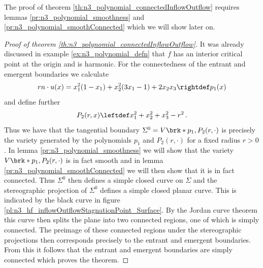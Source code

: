 The proof of theorem \ref{th:n3_polynomial_connectedInflowOutflow} requires lemmas \ref{pr:n3_polynomial_smoothness} and \ref{pr:n3_polynomial_smoothConnected}
which we will show later on.
\begin{proof}[Proof of theorem {\ref{th:n3_polynomial_connectedInflowOutflow}}]
  It was already discussed in example \ref{ex:n3_polynomial_defn} that $f$ has an interior critical point at the
  origin and is harmonic.
  For the connectedness of the entrant and emergent boundaries we calculate
  \begin{align}
    rn\cdot u(x) = x_1^2(1-x_1)+x_2^2(3x_1-1)+2x_2x_3\rightdef p_1(x)\label{eq:n3_polynomial_defp1}
  \end{align}
  and define further
  \begin{align}
    P_2(r,x)\leftdef x_1^2+x_2^2+x_3^2-r^2\,.\label{eq:n3_polynomial_defP2}
  \end{align}
  Thus we have that the tangential boundary $\Sigma^0=V\brk*{p_1,P_2(r,\cdot)}$
  is precisely the variety generated by the polynomials $p_1$ and $P_2(r,\cdot)$ for a
  fixed radius $r>0$.
  In lemma \ref{pr:n3_polynomial_smoothness} we will show that the variety $V\brk*{p_1,P_2(r,\cdot)}$ is in fact smooth
  and in lemma \ref{pr:n3_polynomial_smoothConnected} we will then show that it is in fact connected.
  Thus $\Sigma^0$ then defines a simple closed curve on $\Sigma$
  and the stereographic projection of $\Sigma^0$ defines a simple closed planar curve.
  This is indicated by the black curve in figure \ref{pl:n3_hf_inflowOutflowStagnationPoint_Surface}.
  By the Jordan curve theorem this curve then splits the plane into two connected regions, 
  one of which is simply connected.
  The preimage of these connected regions under the stereographic projections then corresponds
  precisely to the entrant and emergent boundaries.
  From this it follows that the entrant and emergent
  boundaries are simply connected which proves the theorem.
\end{proof}

